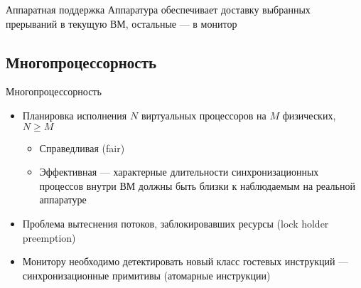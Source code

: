 \begin{frame}{Аппаратная поддержка}
Аппаратура обеспечивает доставку выбранных прерываний в текущую ВМ, остальные — в монитор

\vfill
\centering
{}


\end{frame}

\subsection{Многопроцессорность}

\begin{frame}{Многопроцессорность}
\begin{itemize}
    \item Планировка исполнения $N$ виртуальных процессоров на $M$ физических, $N \geqslant M$
    \begin{itemize}
        \item Справедливая (fair)
        \item Эффективная — характерные длительности синхронизационных процессов внутри ВМ должны быть близки к наблюдаемым на реальной аппаратуре
    \end{itemize}
\end{itemize}

\begin{itemize}
    \item Проблема вытеснения потоков, заблокировавших ресурсы (lock holder preemption)
    \item Монитору необходимо детектировать новый класс гостевых инструкций — синхронизационные примитивы (атомарные инструкции)
\end{itemize}

\end{frame}

